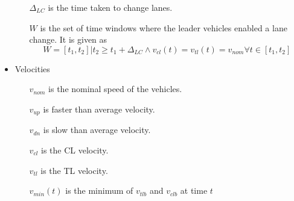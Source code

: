 \begin{itemize}
\begin{itemize}
\item[$\Delta_{LC}$] is the time taken to change lanes.
\item[$W$] is the set of time windows where the leader vehicles enabled a lane change. It is given as 
\begin{equation}
W = {[t_1,t_2]|t_2 \ge t_1 + \Delta_{LC} \land v_{cl}(t) = v_{tl}(t) = v_{nom} \forall t \in [t_1,t_2]}
\end{equation}
\end{itemize}
\item Velocities
\begin{itemize}
\item[$v_{nom}$] is the nominal speed of the vehicles.
\item[$v_{up}$] is faster than average velocity.
\item[$v_{dn}$] is slow than average velocity.
\item[$v_{cl}$] is the CL velocity.
\item[$v_{tl}$] is the TL velocity.
\item[$v_{min}(t)$] is the minimum of $v_{tlb}$ and $v_{clb}$ at time $t$
\end{itemize}
\end{itemize}
